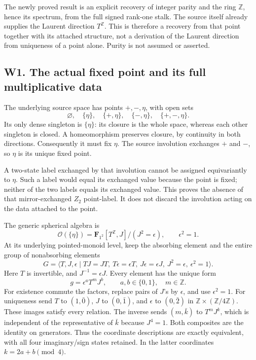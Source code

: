 \documentclass[
  11pt,
]{article}
\begin{document}
The newly proved result is an explicit recovery of integer parity and
the ring \(\mathbb Z\), hence its spectrum, from the full signed
rank-one stalk. The source itself already supplies the Laurent direction
\(T^{\mathbb Z}\). This is therefore a recovery from that point together
with its attached structure, not a derivation of the Laurent direction
from uniqueness of a point alone. Purity is not assumed or asserted.

\subsection{W1. The actual fixed point and its full multiplicative
data}\label{w1.-the-actual-fixed-point-and-its-full-multiplicative-data}

The underlying source space has points \(+, -,\eta\), with open sets \[
\varnothing,\quad\{\eta\},\quad\{+,\eta\},\quad\{-,\eta\},\quad\{+,-,\eta\}.
\] Its only dense singleton is \(\{\eta\}\): its closure is the whole
space, whereas each other singleton is closed. A homeomorphism preserves
closure, by continuity in both directions. Consequently it must fix
\(\eta\). The source involution exchanges \(+\) and \(-\), so \(\eta\)
is its unique fixed point.

A two-state label exchanged by that involution cannot be assigned
equivariantly to \(\eta\). Such a label would equal its exchanged value
because the point is fixed; neither of the two labels equals its
exchanged value. This proves the absence of that mirror-exchanged
\(Z_2\) point-label. It does not discard the involution acting on the
data attached to the point.

The generic spherical algebra is \[
\mathcal O(\{\eta\})=\mathbf F_{1^2}[T^{\mathbb Z},J]/(J^2=\epsilon),\qquad \epsilon^2=1.
\] At its underlying pointed-monoid level, keep the absorbing element
and the entire group of nonabsorbing elements \[
G=\langle T,J,\epsilon\mid TJ=JT,\ T\epsilon=\epsilon T,\ J\epsilon=\epsilon J,\ J^2=\epsilon,\ \epsilon^2=1\rangle.
\] Here \(T\) is invertible, and \(J^{-1}=\epsilon J\). Every element
has the unique form \[
g=\epsilon^aT^mJ^b,\qquad a,b\in\{0,1\},\quad m\in\mathbb Z.
\] For existence commute the factors, replace pairs of \(J\)'s by
\(\epsilon\), and use \(\epsilon^2=1\). For uniqueness send \(T\) to
\((1,\bar0)\), \(J\) to \((0,\bar1)\), and \(\epsilon\) to \((0,\bar2)\)
in \(\mathbb Z\times(\mathbb Z/4\mathbb Z)\). These images satisfy every
relation. The inverse sends \((m,\bar k)\) to \(T^mJ^k\), which is
independent of the representative of \(\bar k\) because \(J^4=1\). Both
composites are the identity on generators. Thus the coordinate
descriptions are exactly equivalent, with all four imaginary/sign states
retained. In the latter coordinates \(k=2a+b\pmod4\).
\end{document}
